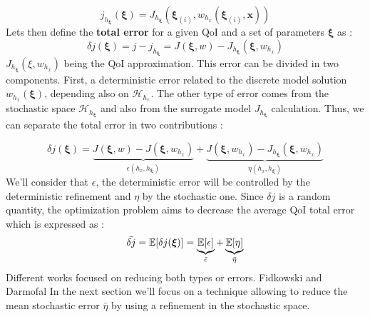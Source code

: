 \documentclass[11pt, a4paper, English]{report}
\begin{document}
\begin{appendix}
$$ j_{h_{\boldsymbol{\xi}}}(\boldsymbol{\xi}) = J_{h_{\boldsymbol{\xi}}}(\boldsymbol{\xi}_{(i)}, w_{h_x}(\boldsymbol{\xi}_{(i)},\boldsymbol{x})) $$
Lets then define the \textbf{total error} for a given QoI and a set of parameters $\boldsymbol{\xi}$ as :
$$\delta j(\boldsymbol{\xi}) = j - j_{h_{\boldsymbol{\xi}}} = J(\boldsymbol{\xi}, w) - J_{h_{\boldsymbol{\xi}}}(\boldsymbol{\xi}, w_{h_x})  $$
$J_{h_{\boldsymbol{\xi}}}(\xi, w_h_x)  $ being the QoI approximation. This error can be divided in two components. First, a deterministic error related to the discrete model solution $w_{h_x}(\boldsymbol{\xi})$, depending also on $\mathcal{H}_h_x$. The other type of error comes from the stochastic space $\mathcal{H}_h_{\boldsymbol{\xi}}$ and also from the surrogate model $J_{h_{\boldsymbol{\xi}}}$ calculation. Thus, we can separate the total error in two contributions :

$$\delta j(\boldsymbol{\xi})= \underbrace{J(\boldsymbol{\xi},w) - J(\boldsymbol{\xi}, w_{h_x})}_{\epsilon(h_x,h_{\boldsymbol{\xi}})} + \underbrace{J(\boldsymbol{\xi}, w_{h_x}) - J_{h_{\boldsymbol{\xi}}}(\boldsymbol{\xi}, w_{h_x})}_{\eta(h_x, h_{\boldsymbol{\xi}})} $$
We'll consider that $\epsilon$, the deterministic error will be controlled by the deterministic refinement and $\eta$ by the stochastic one. Since $\delta j$ is a random quantity, the optimization problem aims to decrease the average QoI total error which is expressed as :
$$\Bar{\delta j} = \mathbb{E}[\delta j(\boldsymbol{\xi})] = \underbrace{\mathbb{E}[\epsilon]}_{\Bar{\epsilon}} + \underbrace{\mathbb{E}[\eta]}_{\Bar{\eta}}$$
Different works focused on reducing both types or errors. Fidkowski and Darmofal \cite{Darmofal}
In the next section we'll focus on a technique allowing to reduce the mean stochastic error $\bar{\eta}$ by using a refinement in the stochastic space.


\end{appendix}
\end{document}

